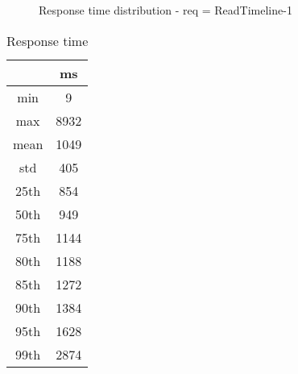 \begin{minipage}{0.75\linewidth}
\begin{figure}[h]
\begin{adjustbox}{max width=1.0\linewidth, keepaspectratio}
  \end{adjustbox}
  \caption{Response time distribution - req = ReadTimeline-1}
\end{figure}
\end{minipage}\hfill\begin{minipage}{0.18\linewidth}
\begin{table}[h]
\begin{tabular}{|cc|}
\hline
\textbf{} & \textbf{ms}\\ \hline
 \Xhline{0.005\arrayrulewidth}
min & 9\\
 \Xhline{0.005\arrayrulewidth}
max & 8932\\
 \Xhline{0.005\arrayrulewidth}
mean & 1049\\
 \Xhline{0.005\arrayrulewidth}
std & 405\\
\hline
\hline
 \Xhline{0.005\arrayrulewidth}
25th & 854\\
 \Xhline{0.005\arrayrulewidth}
50th & 949\\
 \Xhline{0.005\arrayrulewidth}
75th & 1144\\
 \Xhline{0.005\arrayrulewidth}
80th & 1188\\
 \Xhline{0.005\arrayrulewidth}
85th & 1272\\
 \Xhline{0.005\arrayrulewidth}
90th & 1384\\
 \Xhline{0.005\arrayrulewidth}
95th & 1628\\
 \Xhline{0.005\arrayrulewidth}
99th & 2874\\
\hline
\end{tabular}
\caption{Response time}
\end{table}
\end{minipage}\hfill